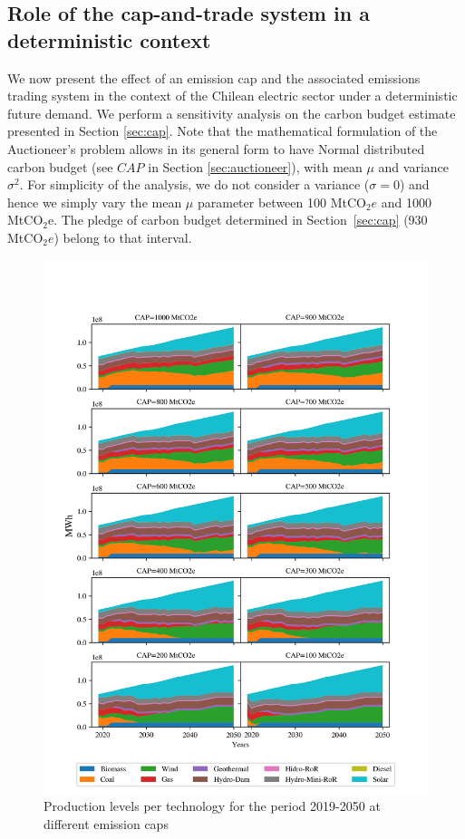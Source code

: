 \documentclass[11pt, letterpaper]{article}
\begin{document}
\subsection{Role of the cap-and-trade system in a deterministic context}\label{sec:deterministic}

We now present the effect of an emission cap and the associated emissions trading system in the context of the Chilean electric sector under a deterministic future demand. We perform a sensitivity analysis on the carbon budget estimate presented in Section  \ref{sec:cap}. Note that the mathematical formulation of the Auctioneer's problem allows in its general form to have Normal distributed carbon budget (see $CAP$ in Section \ref{sec:auctioneer}), with mean $\mu$ and variance $\sigma^2$. For simplicity of the analysis, we do not consider a variance ($\sigma=0$) and hence we simply vary the mean $\mu$ parameter between  100 MtCO$_2e$ and 1000 MtCO$_2$e. The pledge of carbon budget determined in Section~\ref{sec:cap} (930 MtCO$_2e$) belong to that interval.

\smallskip

\begin{figure}[hbtp]
\includegraphics[height=\textheight]{Figures/Q_second_cap.png}
 \caption{Production levels per technology for the period 2019-2050 at different emission caps}
  \label{fig:prod_cap}
\end{figure}
  
\end{document}

